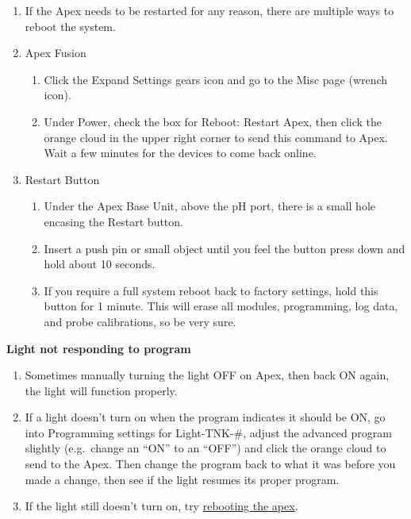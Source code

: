 \documentclass[
]{book}
\providecommand{\tightlist}{%
  \setlength{\itemsep}{0pt}\setlength{\parskip}{0pt}}
\begin{document}
\begin{enumerate}
\def\labelenumi{\arabic{enumi}.}
\tightlist
\item
  If the Apex needs to be restarted for any reason, there are multiple ways to reboot the system.
\item
  Apex Fusion

  \begin{enumerate}
  \def\labelenumii{\arabic{enumii}.}
  \tightlist
  \item
    Click the Expand Settings gears icon and go to the Misc page (wrench icon).
  \item
    Under Power, check the box for Reboot: Restart Apex, then click the orange cloud in the upper right corner to send this command to Apex. Wait a few minutes for the devices to come back online.
  \end{enumerate}
\item
  Restart Button

  \begin{enumerate}
  \def\labelenumii{\arabic{enumii}.}
  \tightlist
  \item
    Under the Apex Base Unit, above the pH port, there is a small hole encasing the Restart button.
  \item
    Insert a push pin or small object until you feel the button press down and hold about 10 seconds.
  \item
    If you require a full system reboot back to factory settings, hold this button for 1 minute. This will erase all modules, programming, log data, and probe calibrations, so be very sure.
  \end{enumerate}
\end{enumerate}

\textbf{Light not responding to program}

\begin{enumerate}
\def\labelenumi{\arabic{enumi}.}
\tightlist
\item
  Sometimes manually turning the light OFF on Apex, then back ON again, the light will function properly.
\item
  If a light doesn't turn on when the program indicates it should be ON, go into Programming settings for Light-TNK-\#, adjust the advanced program slightly (e.g.~change an ``ON'' to an ``OFF'') and click the orange cloud to send to the Apex. Then change the program back to what it was before you made a change, then see if the light resumes its proper program.
\item
  If the light still doesn't turn on, try \protect\hyperlink{Reboot_Apex}{rebooting the apex}.
\end{enumerate}
\end{document}
